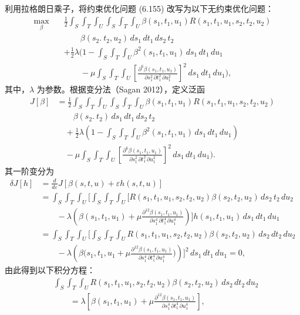 利用拉格朗日乘子，将约束优化问题 (6.155) 改写为以下无约束优化问题：
\begin{equation}
\begin{aligned}
\max_\beta\quad&\frac12\int_S\int_T\int_U\int_S\int_T\int_U\beta(s_1,t_1,u_1)R(s_1,t_1,u_1,s_2,t_2,u_2)\\
&\qquad\beta(s_2.\ t_2,u_2)\,ds_1\,dt_1\,ds_2\,t_2\\
&+\frac12\lambda\Biggl(1-\int_S\int_T\int_U\beta^2(s_1,t_1,u_1)\,ds_1\,dt_1\,du_1\\
&\qquad-\mu\int_S\int_T\int_U\left[\frac{\partial^6\beta(s_1,t_1,u_1)}{\partial s_1^2\,\partial t_1^2\,\partial u_1^2}\right]^2\,ds_1\,dt_1\,du_1\Biggr),
\end{aligned}\tag{6.156}
\end{equation}
其中，$\lambda$ 为参数。根据变分法（Sagan 2012），定义泛函
\[
\begin{aligned}
J[\beta]&=\frac12\int_S\int_T\int_U\int_S\int_T\int_U\beta(s_1,t_1,u_1)R(s_1,t_1,u_1,s_2,t_2,u_2)\\
&\qquad\beta(s_2.\ t_2)\,ds_1\,dt_1\,ds_2\,t_2\\
&\quad+\frac12\lambda\left(1-\int_S\int_T\int_U\beta^2(s_1,t_1,u_1)\,ds_1\,dt_1\,du_1\right)\\
&\quad-\mu\int_S\int_T\int_U\left[\frac{\partial^6\beta(s_1,t_1,u_1)}{\partial s_1^2\,\partial t_1^2\,\partial u_1^2}\right]^2\,ds_1\,dt_1\,du_1).
\end{aligned}
\]
其一阶变分为
\[
\begin{aligned}
\delta J[h]&=\frac d{d\varepsilon}J[\beta(s,t,u)+\varepsilon h(s,t,u)]\\
&=\int_S\int_T\int_U\Biggl[\int_S\int_T\int_U\Biggl[R(s_1,t_1,u_1,s_2,t_2,u_2)\beta(s_2,t_2,u_2)\,ds_2\,t_2\,du_2\\
&\qquad-\lambda\left(\beta(s_1,t_1,u_1)+\mu\frac{\partial^{12}\beta(s_1,t_1,u_1)}{\partial s_1^4\,\partial t_1^4\,\partial u_1^4}\right)\Biggr]h(s_1,t_1,u_1)\,ds_1\,dt_1\,du_1\\
&=\int_S\int_T\int_U\Biggl[\int_S\int_T\int_U R(s_1,t_1,u_1,s_2,t_2,u_2)\beta(s_2,t_2,u_2)\,ds_2\,dt_2\,du_2\\
&\qquad-\lambda\left(\beta\biggl(s_1,t_1,u_1+\mu\frac{\partial^{12}\beta(s_1,t_1,u_1)}{\partial s_1^4\,\partial t_1^4\,\partial u_1^4}\biggr)\right)\Biggr]^2\,ds_1\,dt_1\,du_1=0,
\end{aligned}
\]
由此得到以下积分方程：
\begin{equation}
\begin{aligned}
&\int_S\int_T\int_U R(s_1,t_1,u_1,s_2,t_2,u_2)\beta(s_2,t_2,u_2)\,ds_2\,dt_2\,du_2\\
&\qquad=\lambda\left[\beta(s_1,t_1,u_1)+\mu\frac{\partial^{12}\beta(s_1,t_1,u_1)}{\partial s_1^4\,\partial t_1^4\,\partial u_1^4}\right],
\end{aligned}\tag{6.157}
\end{equation}
